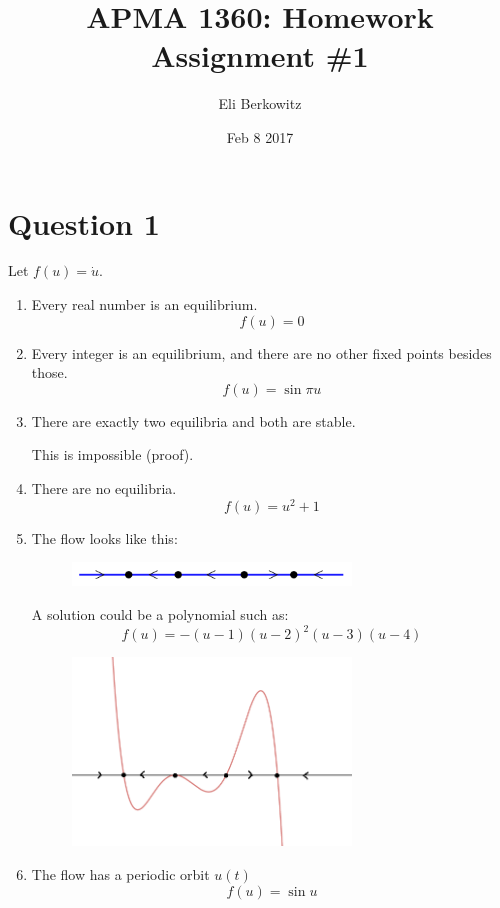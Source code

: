 \documentclass[12pt,a4paper]{article}
\title{APMA 1360: Homework Assignment \#1}
\author{Eli Berkowitz}
\date{Feb 8 2017}
\begin{document}
\maketitle

\section{Question 1}

Let $f(u) = \dot{u}$.
\begin{enumerate}[label = (\roman*)]
    \item Every real number is an equilibrium.
    $$f(u) = 0$$
    \item Every integer is an equilibrium, and there are no other fixed points besides those.
    $$f(u) = \sin{\pi u}$$
    \item There are exactly two equilibria and both are stable.

    This is impossible (proof).
    \item There are no equilibria.
        $$f(u) = u^2 + 1$$
    \item The flow looks like this:
    \begin{figure}[H]
        \centering
        \includegraphics[width=0.7\textwidth]{flow-chart}
    \end{figure}
    A solution could be a polynomial such as:
    $$f(u) = -(u - 1) (u - 2)^{2} (u - 3)(u - 4)$$
    \begin{figure}[H]
        \centering
        \includegraphics[width=0.7\textwidth]{flow-chart-soln}
    \end{figure}

    \item The flow has a periodic orbit $u(t)$
    $$f(u) = \sin{u}$$
\end{enumerate}
\end{document}
